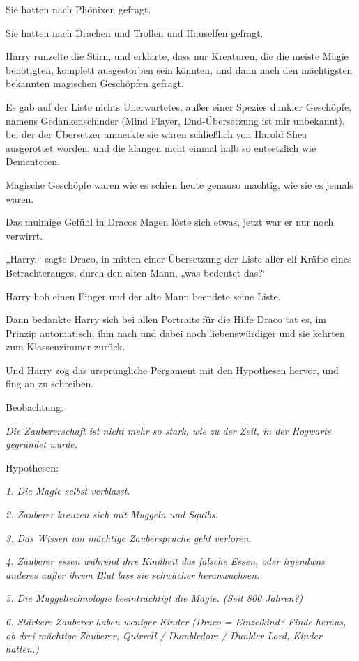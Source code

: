 {Sie hatten nach Phönixen gefragt.

Sie hatten nach Drachen und Trollen und Hauselfen gefragt.

Harry runzelte die Stirn, und erklärte, dass nur Kreaturen, die die meiste Magie benötigten, komplett ausgestorben sein könnten, und dann nach den mächtigsten bekannten magischen Geschöpfen gefragt.

Es gab auf der Liste nichts Unerwartetes, außer einer Spezies dunkler Geschöpfe, namens Gedankenschinder (Mind Flayer, Dnd-Übersetzung ist mir unbekannt), bei der der Übersetzer anmerkte sie wären schließlich von Harold Shea ausgerottet worden, und die klangen nicht einmal halb so entsetzlich wie Dementoren.

Magische Geschöpfe waren wie es schien heute genauso machtig, wie sie es jemals waren.

Das mulmige Gefühl in Dracos Magen löste sich etwas, jetzt war er nur noch verwirrt.

„Harry,“ sagte Draco, in mitten einer Übersetzung der Liste aller elf Kräfte eines Betrachterauges, durch den alten Mann, „was bedeutet das?“

Harry hob einen Finger und der alte Mann beendete seine Liste.

Dann bedankte Harry sich bei allen Portraits für die Hilfe \later Draco tat es, im Prinzip automatisch, ihm nach und dabei noch liebenswürdiger \later und sie kehrten zum Klassenzimmer zurück.

Und Harry zog das ursprüngliche Pergament mit den Hypothesen hervor, und fing an zu schreiben.

Beobachtung:

\emph{Die Zaubererschaft ist nicht mehr so stark, wie zu der Zeit, in der Hogwarts gegründet wurde.}

Hypothesen:

\emph{1. Die Magie selbst verblasst.}

\emph{2. Zauberer} \emph{kreuzen sich mit Muggeln und Squibs.}

\emph{3. Das Wissen um mächtige Zaubersprüche geht verloren.}

\emph{4. Zauberer essen während ihre Kindheit das falsche Essen, oder irgendwas anderes außer ihrem Blut lass sie schwächer heranwachsen.}

\emph{5. Die Muggeltechnologie beeinträchtigt die Magie. (Seit 800 Jahren?)}

\emph{6. Stärkere Zauberer haben weniger Kinder (Draco = Einzelkind? Finde heraus, ob drei mächtige Zauberer, Quirrell / Dumbledore / Dunkler Lord, Kinder hatten.)}

}
